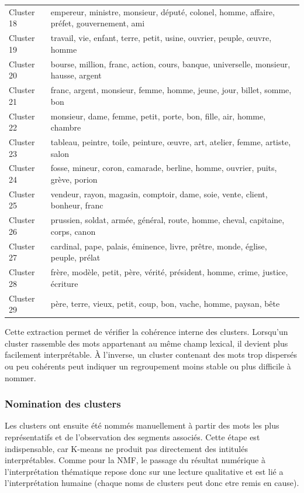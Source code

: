\begin{longtable}{p{2cm}p{11.5cm}}
Cluster 18 & empereur, ministre, monsieur, député, colonel, homme, affaire, préfet, gouvernement, ami \\
Cluster 19 & travail, vie, enfant, terre, petit, usine, ouvrier, peuple, œuvre, homme \\
Cluster 20 & bourse, million, franc, action, cours, banque, universelle, monsieur, hausse, argent \\
Cluster 21 & franc, argent, monsieur, femme, homme, jeune, jour, billet, somme, bon \\
Cluster 22 & monsieur, dame, femme, petit, porte, bon, fille, air, homme, chambre \\
Cluster 23 & tableau, peintre, toile, peinture, œuvre, art, atelier, femme, artiste, salon \\
Cluster 24 & fosse, mineur, coron, camarade, berline, homme, ouvrier, puits, grève, porion \\
Cluster 25 & vendeur, rayon, magasin, comptoir, dame, soie, vente, client, bonheur, franc \\
Cluster 26 & prussien, soldat, armée, général, route, homme, cheval, capitaine, corps, canon \\
Cluster 27 & cardinal, pape, palais, éminence, livre, prêtre, monde, église, peuple, prélat \\
Cluster 28 & frère, modèle, petit, père, vérité, président, homme, crime, justice, écriture \\
Cluster 29 & père, terre, vieux, petit, coup, bon, vache, homme, paysan, bête \\
\bottomrule
\end{longtable}

Cette extraction permet de vérifier la cohérence interne des clusters. Lorsqu'un cluster rassemble des mots appartenant au même champ lexical, il devient plus facilement interprétable. À l'inverse, un cluster contenant des mots trop dispersés ou peu cohérents peut indiquer un regroupement moins stable ou plus difficile à nommer.

\subsubsection{Nomination des clusters}

Les clusters ont ensuite été nommés manuellement à partir des mots les plus représentatifs et de l'observation des segments associés. Cette étape est indispensable, car K-means ne produit pas directement des intitulés interprétables. Comme pour la NMF, le passage du résultat numérique à l'interprétation thématique repose donc sur une lecture qualitative et est lié a l'interprétation humaine (chaque noms de clusters peut donc etre remis en cause).

